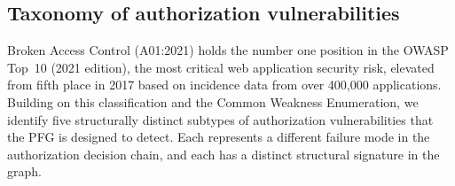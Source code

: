 \subsection{Taxonomy of authorization vulnerabilities}
\label{sec:det-taxonomy}

Broken Access Control (A01:2021) holds the number one position in the OWASP
Top~10 (2021 edition), the most critical web application security risk,
elevated from fifth place in 2017 based on incidence data from over 400,000
applications. Building on this classification and the Common Weakness
Enumeration, we identify five structurally distinct subtypes of authorization
vulnerabilities that the PFG is designed to detect. Each represents a
different failure mode in the authorization decision chain, and each has a
distinct structural signature in the graph.

